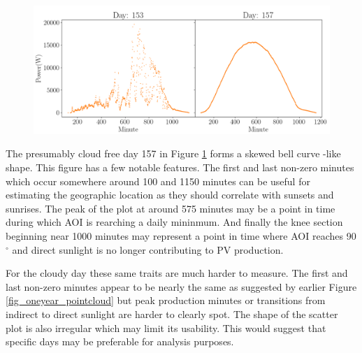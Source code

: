 \newpage
\begin{figure}[h!]
\centering
\includegraphics[width=1\linewidth]{pics/twodayshelsinki}
\label{fig_cloudfree_vs_cloudy}
\end{figure}

\noindent The presumably \gls{cloud free day} 157 in Figure \ref{fig_cloudfree_vs_cloudy} forms a skewed bell curve -like shape. This figure has a few notable features. The first and last non-zero minutes which occur somewhere around 100 and 1150 minutes can be useful for estimating the geographic location as they should correlate with sunsets and sunrises. The peak of the plot at around 575 minutes may be a point in time during which AOI is rearching a daily mininmum. And finally the knee section beginning near 1000 minutes may represent a point in time where AOI reaches 90$^\circ$ and direct sunlight is no longer contributing to PV production.

For the cloudy day these same traits are much harder to measure. The first and last non-zero minutes appear to be nearly the same as suggested by earlier Figure \ref{fig_oneyear_pointcloud} but peak production minutes or transitions from indirect to direct sunlight are harder to clearly spot. The shape of the scatter plot is also irregular which may limit its usability. This would suggest that specific days may be preferable for analysis purposes.




\newpage

